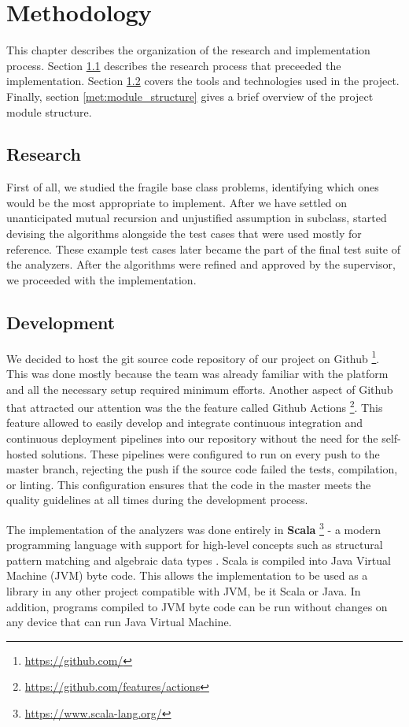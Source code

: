\chapter{Methodology}
\label{chap:met}

This chapter describes the organization of the research and implementation process. Section \ref{met:research} describes the research process that preceeded the implementation. Section \ref{met:development} covers the tools and technologies used in the project. Finally, section \ref{met:module_structure} gives a brief overview of the project module structure. 

\section{Research}
\label{met:research}
First of all, we studied the fragile base class problems, identifying which ones would be the most appropriate to implement. After we have settled on unanticipated mutual recursion and unjustified assumption in subclass, started devising the algorithms alongside the test cases that were used mostly for reference. These example test cases later became the part of the final test suite of the analyzers. After the algorithms were refined and approved by the supervisor, we proceeded with the implementation.

\section{Development}
\label{met:development}
We decided to host the git \cite{git} source code repository of our project on Github \footnote{\url{https://github.com/}}. This was done mostly because the team was already familiar with the platform and all the necessary setup required minimum efforts. Another aspect of Github that attracted our attention was the the feature called Github Actions \footnote{\url{https://github.com/features/actions}}. This feature allowed to easily develop and integrate continuous integration \cite{ci} and continuous deployment \cite{cd} pipelines into our repository without the need for the self-hosted solutions. These pipelines were configured to run on every push to the master branch, rejecting the push if the source code failed the tests, compilation, or linting. This configuration ensures that the code in the master meets the quality guidelines at all times during the development process. 

The implementation of the analyzers was done entirely in \textbf{Scala} \footnote{\url{https://www.scala-lang.org/}} - a modern programming language with support for high-level concepts such as structural pattern matching \cite{pattern_matching} and algebraic data types \cite{adts}. Scala is compiled into Java Virtual Machine (JVM) byte code. This allows the implementation to be used as a library in any other project compatible with JVM, be it Scala or Java. In addition, programs compiled to JVM byte code can be run without changes on any device that can run Java Virtual Machine.

